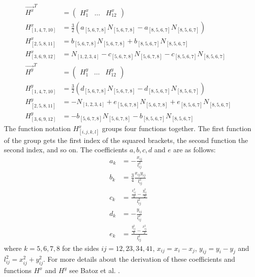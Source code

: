   \begin{align}
  \vec{H^x}^T &= \begin{pmatrix}
  H_1^x & \dots & H_{12}^x
  \end{pmatrix} \nonumber\\
  H_{\left[1,4,7,10\right]}^x &= \frac{3}{2}\left(a_{\left[5,6,7,8\right]} N_{\left[5,6,7,8\right]} - a_{\left[8,5,6,7\right]} N_{\left[8,5,6,7\right]}\right) \nonumber\\
  H_{\left[2,5,8,11\right]}^x &= b_{\left[5,6,7,8\right]} N_{\left[5,6,7,8\right]} + b_{\left[8,5,6,7\right]} N_{\left[8,5,6,7\right]} \nonumber\\
  H_{\left[3,6,9,12\right]}^x &= N_{\left[1,2,3,4\right]} - c_{\left[5,6,7,8\right]} N_{\left[5,6,7,8\right]} - c_{\left[8,5,6,7\right]} N_{\left[8,5,6,7\right]} \nonumber\\
  \vec{H^y}^T &= \begin{pmatrix}
  H_1^y & \dots & H_{12}^y
  \end{pmatrix} \nonumber\\
  H_{\left[1,4,7,10\right]}^y &= \frac{3}{2}\left(d_{\left[5,6,7,8\right]} N_{\left[5,6,7,8\right]} - d_{\left[8,5,6,7\right]} N_{\left[8,5,6,7\right]}\right) \nonumber\\
  H_{\left[2,5,8,11\right]}^y &= -N_{\left[1,2,3,4\right]} + e_{\left[5,6,7,8\right]} N_{\left[5,6,7,8\right]} + e_{\left[8,5,6,7\right]} N_{\left[8,5,6,7\right]} \nonumber\\
  H_{\left[3,6,9,12\right]}^y &= -b_{\left[5,6,7,8\right]} N_{\left[5,6,7,8\right]} - b_{\left[8,5,6,7\right]} N_{\left[8,5,6,7\right]} \nonumber
  \end{align}
  The function notation $H_{\left[i,j,k,l\right]}^x$ groups four functions together. The first function of the group gets the first index of the squared brackets, the second function the second index, and so on. The coefficients $a,b,c,d$ and $e$ are as follows:
  \begin{align}
  a_k &= -\frac{x_{ij}}{l_{ij}^2} \nonumber\\
  b_k &= \frac{3}{4} \frac{x_{ij} y_{ij}}{l_{ij}^2} \nonumber\\
  c_k &= \frac{ \frac{x_{ij}^2}{4} - \frac{y_{ij}^2}{2} }{l_{ij}^2} \nonumber\\
  d_k &= -\frac{y_{ij}}{l_{ij}^2} \nonumber\\
  e_k &= \frac{ \frac{y_{ij}^2}{4} - \frac{x_{ij}^2}{2} }{l_{ij}^2} \nonumber
  \end{align}
  where $k = 5,6,7,8$ for the sides $ij = 12, 23, 34, 41$, $x_{ij} = x_i - x_j$, $y_{ij} = y_i - y_j$ and $l_{ij}^2 = x_{ij}^2 + y_{ij}^2$. For more details about the derivation of these coefficients and functions $H^x$ and $H^y$ see Batoz et al. \cite{batoz1982evaluation}.
  

